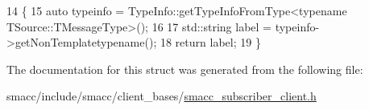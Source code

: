 \begin{DoxyCode}
14   \{
15     \textcolor{keyword}{auto} typeinfo = TypeInfo::getTypeInfoFromType<typename TSource::TMessageType>();
16 
17     std::string label = typeinfo->getNonTemplatetypename();
18     \textcolor{keywordflow}{return} label;
19   \}
\end{DoxyCode}


The documentation for this struct was generated from the following file\+:\begin{DoxyCompactItemize}
\item 
smacc/include/smacc/client\+\_\+bases/\hyperlink{smacc__subscriber__client_8h}{smacc\+\_\+subscriber\+\_\+client.\+h}\end{DoxyCompactItemize}
